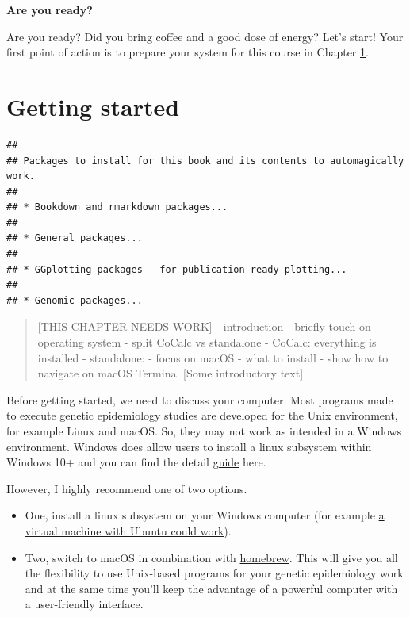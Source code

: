 \documentclass[
]{book}
\providecommand{\tightlist}{%
  \setlength{\itemsep}{0pt}\setlength{\parskip}{0pt}}
\begin{document}
\textbf{Are you ready?}

Are you ready? Did you bring coffee and a good dose of energy? Let's start! Your first point of action is to prepare your system for this course in Chapter \ref{getting-started}.

\hypertarget{getting-started}{%
\chapter{Getting started}\label{getting-started}}

\begin{lstlisting}
## 
## Packages to install for this book and its contents to automagically work.
## 
## * Bookdown and rmarkdown packages...
## 
## * General packages...
## 
## * GGplotting packages - for publication ready plotting...
## 
## * Genomic packages...
\end{lstlisting}

\begin{quote}
{[}THIS CHAPTER NEEDS WORK{]}
- introduction
- briefly touch on operating system
- split CoCalc vs standalone
- CoCalc: everything is installed
- standalone:
- focus on macOS
- what to install
- show how to navigate on macOS Terminal
{[}Some introductory text{]}
\end{quote}

Before getting started, we need to discuss your computer. Most programs made to execute genetic epidemiology studies are developed for the Unix environment, for example Linux and macOS. So, they may not work as intended in a Windows environment. Windows does allow users to install a linux subsystem within Windows 10+ and you can find the detail \href{https://docs.microsoft.com/en-us/windows/wsl/about}{guide} here.

However, I highly recommend one of two options.

\begin{itemize}
\tightlist
\item
  One, install a linux subsystem on your Windows computer (for example \href{https://blog.storagecraft.com/the-dead-simple-guide-to-installing-a-linux-virtual-machine-on-windows/}{a virtual machine with Ubuntu could work}).
\item
  Two, switch to macOS in combination with \href{https://brew.sh}{homebrew}. This will give you all the flexibility to use Unix-based programs for your genetic epidemiology work and at the same time you'll keep the advantage of a powerful computer with a user-friendly interface.
\end{itemize}
\end{document}
